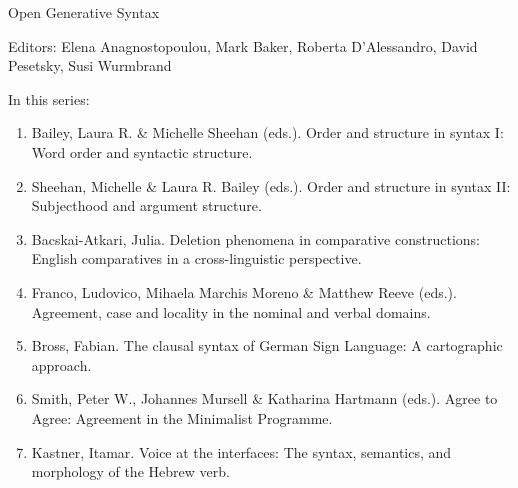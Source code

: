 {\large Open Generative Syntax}

\bigskip

Editors:   Elena Anagnostopoulou,
    Mark Baker,
    Roberta D’Alessandro,
    David Pesetsky,
    Susi Wurmbrand


\bigskip

In this series:

\begin{enumerate}
\item Bailey, Laura R. \& Michelle Sheehan (eds.). Order and structure in syntax I: Word order and syntactic structure.
\item Sheehan, Michelle \& Laura R. Bailey (eds.).  Order and structure in syntax II: Subjecthood and argument structure.
\item Bacskai-Atkari, Julia. Deletion phenomena in comparative constructions: English comparatives in a cross-linguistic perspective.
\item Franco, Ludovico, Mihaela Marchis Moreno \& Matthew Reeve (eds.). Agreement, case and locality in the nominal and verbal domains.
\item Bross, Fabian. The clausal syntax of German Sign Language: A cartographic approach.
\item Smith, Peter W., Johannes Mursell \& Katharina Hartmann (eds.). Agree to Agree: Agreement in the Minimalist Programme.
\item Kastner, Itamar. Voice at the interfaces: The syntax, semantics, and morphology of the Hebrew verb.
\end{enumerate}



\vfill

